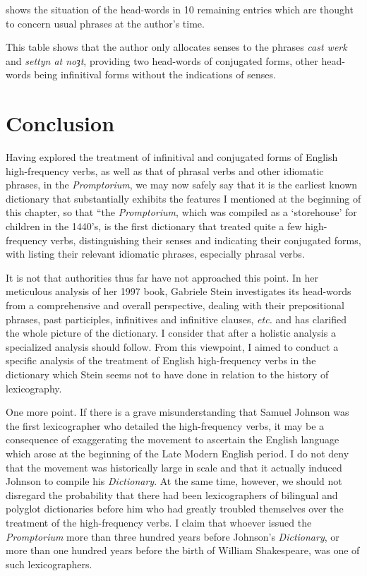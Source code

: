 \documentclass[output=paper,colorlinks,citecolor=brown,arabicfont,chinesefont]{langscibook}
\begin{document}
 shows the situation of the head-words in 10 remaining entries which are thought to concern usual phrases at the author’s time.



This table shows that the author only allocates senses to the phrases \emph{cast werk} and \emph{settyn at noȝt}, providing two head-words of conjugated forms, other head-words being infinitival forms without the indications of senses.

\section{Conclusion}
\largerpage
Having explored the treatment of infinitival and conjugated forms of English high-frequency verbs, as well as that of phrasal verbs and other idiomatic phrases, in the \emph{Promptorium}, we may now safely say that it is the earliest known dictionary that substantially exhibits the features I mentioned at the beginning of this chapter, so that “the \emph{Promptorium}, which was compiled as a ‘storehouse’ for children in the 1440’s, is the first dictionary that treated quite a few high-frequency verbs, distinguishing their senses and indicating their conjugated forms, with listing their relevant idiomatic phrases, especially phrasal verbs.

It is not that authorities thus far have not approached this point. In her meticulous analysis of her 1997 book, Gabriele Stein investigates its head-words from a comprehensive and overall perspective, dealing with their prepositional phrases, past participles, infinitives and infinitive clauses, \emph{etc.} and has clarified the whole picture of the dictionary. I consider that after a holistic analysis a specialized analysis should follow. From this viewpoint, I aimed to conduct a specific analysis of the treatment of English high-frequency verbs in the dictionary which Stein seems not to have done in relation to the history of lexicography.

One more point. If there is a grave misunderstanding that Samuel Johnson was the first lexicographer who detailed the high-frequency verbs, it may be a consequence of exaggerating the movement to ascertain the English language which arose at the beginning of the Late Modern English period. I do not deny that the movement was historically large in scale and that it actually induced Johnson to compile his \emph{Dictionary}. At the same time, however, we should not disregard the probability that there had been lexicographers of bilingual and polyglot dictionaries before him who had greatly troubled themselves over the treatment of the high-frequency verbs. I claim that  whoever issued the \emph{Promptorium} more than three hundred years before Johnson’s \emph{Dictionary}, or more than one hundred years before the birth of William Shakespeare, was one of such lexicographers.
\end{document}
